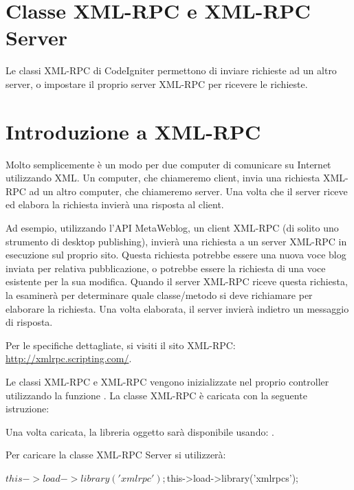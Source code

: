 \section{Classe XML-RPC e XML-RPC Server}
\label{class:xml}

Le classi XML-RPC di CodeIgniter permettono di inviare richieste ad un altro server, o impostare il proprio server XML-RPC per ricevere le richieste.

\section*{Introduzione a XML-RPC}

Molto semplicemente è un modo per due computer di comunicare su Internet utilizzando \ac{XML}. Un computer, che chiameremo client, invia una richiesta XML-RPC ad un altro computer, che chiameremo server. Una volta che il server riceve ed elabora la richiesta invierà una risposta al client.

Ad esempio, utilizzando l'API MetaWeblog, un client XML-RPC (di solito uno strumento di desktop publishing), invierà una richiesta a un server XML-RPC in esecuzione sul proprio sito. Questa richiesta potrebbe essere una nuova voce blog inviata per relativa pubblicazione, o potrebbe essere la richiesta di una voce esistente per la sua modifica. Quando il server XML-RPC riceve questa richiesta, la esaminerà per determinare quale classe/metodo si deve richiamare per elaborare la richiesta. Una volta elaborata, il server invierà indietro un messaggio di risposta.

Per le specifiche dettagliate, si visiti il sito XML-RPC: \url{http://xmlrpc.scripting.com/}.

Le classi XML-RPC e XML-RPC vengono inizializzate nel proprio controller utilizzando la funzione . La classe XML-RPC è caricata con la seguente istruzione:


Una volta caricata, la libreria oggetto sarà disponibile usando: .

Per caricare la classe XML-RPC Server si utilizzerà:

\begin{code}
$this->load->library('xmlrpc');
$this->load->library('xmlrpcs');
\end{code}

